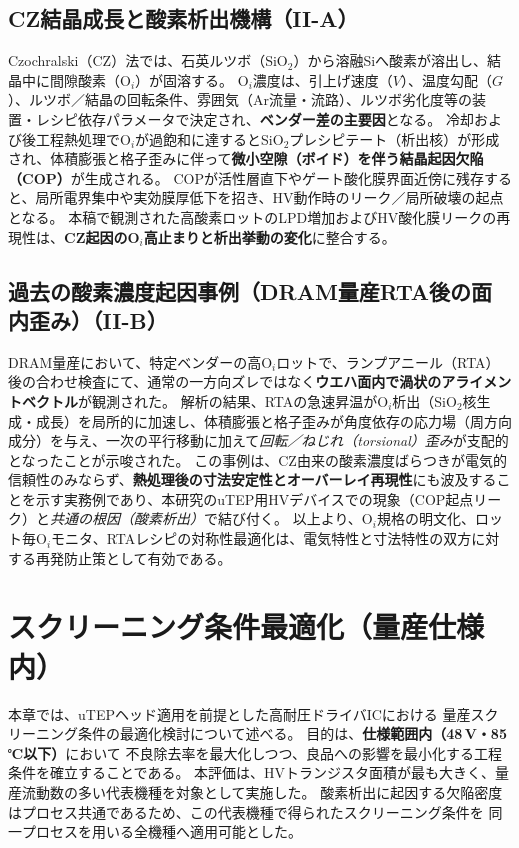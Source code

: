 \documentclass[twocolumn]{ieeetran}
\begin{document}
\subsection{CZ結晶成長と酸素析出機構（II-A）}\label{sec:CZ}
Czochralski（CZ）法では、石英ルツボ（SiO$_2$）から溶融Siへ酸素が溶出し、結晶中に間隙酸素（O$_i$）が固溶する。
O$_i$濃度は、引上げ速度（$V$）、温度勾配（$G$）、ルツボ／結晶の回転条件、雰囲気（Ar流量・流路）、ルツボ劣化度等の装置・レシピ依存パラメータで決定され、\textbf{ベンダー差の主要因}となる。
冷却および後工程熱処理でO$_i$が過飽和に達するとSiO$_2$プレシピテート（析出核）が形成され、体積膨張と格子歪みに伴って\textbf{微小空隙（ボイド）を伴う結晶起因欠陥（COP）}が生成される。
COPが活性層直下やゲート酸化膜界面近傍に残存すると、局所電界集中や実効膜厚低下を招き、HV動作時のリーク／局所破壊の起点となる。
本稿で観測された高酸素ロットのLPD増加およびHV酸化膜リークの再現性は、\textbf{CZ起因のO$_i$高止まりと析出挙動の変化}に整合する。

\subsection{過去の酸素濃度起因事例（DRAM量産RTA後の面内歪み）（II-B）}\label{sec:DRAMcase}
DRAM量産において、特定ベンダーの高O$_i$ロットで、ランプアニール（RTA）後の合わせ検査にて、通常の一方向ズレではなく\textbf{ウエハ面内で渦状のアライメントベクトル}が観測された。
解析の結果、RTAの急速昇温がO$_i$析出（SiO$_2$核生成・成長）を局所的に加速し、体積膨張と格子歪みが角度依存の応力場（周方向成分）を与え、一次の平行移動に加えて\textit{回転／ねじれ（torsional）歪み}が支配的となったことが示唆された。
この事例は、CZ由来の酸素濃度ばらつきが電気的信頼性のみならず、\textbf{熱処理後の寸法安定性とオーバーレイ再現性}にも波及することを示す実務例であり、本研究のuTEP用HVデバイスでの現象（COP起点リーク）と\textit{共通の根因（酸素析出）}で結び付く。
以上より、O$_i$規格の明文化、ロット毎O$_i$モニタ、RTAレシピの対称性最適化は、電気特性と寸法特性の双方に対する再発防止策として有効である。

\section{スクリーニング条件最適化（量産仕様内）}

本章では、uTEPヘッド適用を前提とした高耐圧ドライバICにおける
量産スクリーニング条件の最適化検討について述べる。
目的は、\textbf{仕様範囲内（48\,V・85\,℃以下）}において
不良除去率を最大化しつつ、良品への影響を最小化する工程条件を確立することである。
本評価は、HVトランジスタ面積が最も大きく、量産流動数の多い代表機種を対象として実施した。
酸素析出に起因する欠陥密度はプロセス共通であるため、この代表機種で得られたスクリーニング条件を
同一プロセスを用いる全機種へ適用可能とした。
\end{document}
